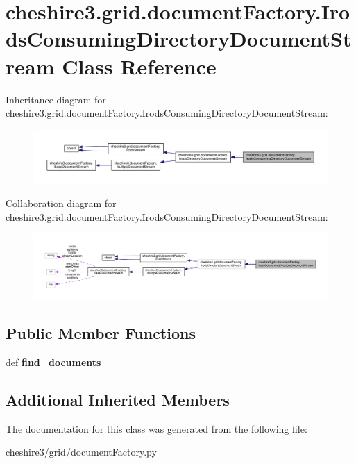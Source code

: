 \hypertarget{classcheshire3_1_1grid_1_1document_factory_1_1_irods_consuming_directory_document_stream}{\section{cheshire3.\-grid.\-document\-Factory.\-Irods\-Consuming\-Directory\-Document\-Stream Class Reference}
\label{classcheshire3_1_1grid_1_1document_factory_1_1_irods_consuming_directory_document_stream}
}


Inheritance diagram for cheshire3.\-grid.\-document\-Factory.\-Irods\-Consuming\-Directory\-Document\-Stream\-:
\nopagebreak
\begin{figure}[H]
\begin{center}
\leavevmode
\includegraphics[width=350pt]{classcheshire3_1_1grid_1_1document_factory_1_1_irods_consuming_directory_document_stream__inherit__graph}
\end{center}
\end{figure}


Collaboration diagram for cheshire3.\-grid.\-document\-Factory.\-Irods\-Consuming\-Directory\-Document\-Stream\-:
\nopagebreak
\begin{figure}[H]
\begin{center}
\leavevmode
\includegraphics[width=350pt]{classcheshire3_1_1grid_1_1document_factory_1_1_irods_consuming_directory_document_stream__coll__graph}
\end{center}
\end{figure}
\subsection*{Public Member Functions}
\begin{DoxyCompactItemize}
\item 
\hypertarget{classcheshire3_1_1grid_1_1document_factory_1_1_irods_consuming_directory_document_stream_ac2e3080eccb599b236038ddd32f73335}{def {\bfseries find\-\_\-documents}}\label{classcheshire3_1_1grid_1_1document_factory_1_1_irods_consuming_directory_document_stream_ac2e3080eccb599b236038ddd32f73335}

\end{DoxyCompactItemize}
\subsection*{Additional Inherited Members}


The documentation for this class was generated from the following file\-:\begin{DoxyCompactItemize}
\item 
cheshire3/grid/document\-Factory.\-py\end{DoxyCompactItemize}
